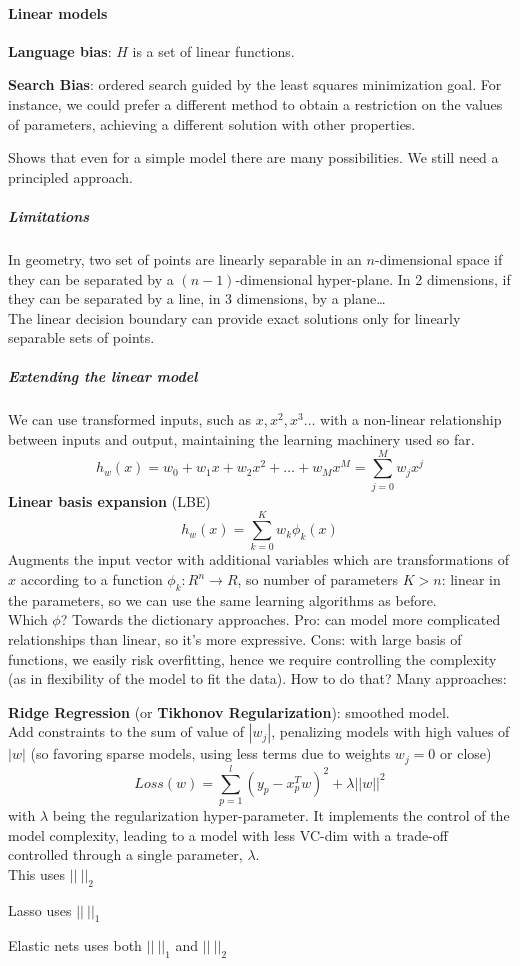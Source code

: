 \documentclass[10pt]{report}
\begin{document}
\paragraph{Linear models}\begin{list}{}{}
	\item \textbf{Language bias}: $H$ is a set of linear functions.
	\item \textbf{Search Bias}: ordered search guided by the least squares minimization goal. For instance, we could prefer a different method to obtain a restriction on the values of parameters, achieving a different solution with other properties.
\end{list}
Shows that even for a simple model there are many possibilities. We still need a principled approach.
\subparagraph{Limitations} In geometry, two set of points are linearly separable in an $n$-dimensional space if they can be separated by a $(n-1)$-dimensional hyper-plane. In 2 dimensions, if they can be separated by a line, in 3 dimensions, by a plane\ldots\\
The linear decision boundary can provide exact solutions only for linearly separable sets of points.
\subparagraph{Extending the linear model} We can use transformed inputs, such as $x, x^2, x^3\ldots$ with a non-linear relationship between inputs and output, maintaining the learning machinery used so far. $$h_w(x) = w_0 + w_1 x + w_2 x^2 + \ldots + w_M x^M = \sum_{j=0}^M w_j x^j$$ \textbf{Linear basis expansion} (LBE) $$h_w(x) = \sum_{k=0}^K w_k\phi_k(x)$$ Augments the input vector with additional variables which are transformations of $x$ according to a function $\phi_k : R^n \rightarrow R$, so number of parameters $K > n$: linear in the parameters, so we can use the same learning algorithms as before.\\
Which $\phi$? Towards the dictionary approaches. Pro: can model more complicated relationships than linear, so it's more expressive. Cons: with large basis of functions, we easily risk overfitting, hence we require controlling the complexity (as in flexibility of the model to fit the data). How to do that? Many approaches:
\begin{list}{}{}
	\item \textbf{Ridge Regression} (or \textbf{Tikhonov Regularization}): smoothed model.\\
	Add constraints to the sum of value of $|w_j|$, penalizing models with high values of $|w|$ (so favoring sparse models, using less terms due to weights $w_j = 0$ or close)
	$$Loss(w) = \sum_{p=1}^l (y_p - x_p^T w)^2 + \lambda||w||^2$$ with $\lambda$ being the regularization hyper-parameter. It implements the control of the model complexity, leading to a model with less VC-dim with a trade-off controlled through a single parameter, $\lambda$.\\
	This uses $||\:||_2$
	\item Lasso uses $||\:||_1$
	\item Elastic nets uses both $||\:||_1$ and $||\:||_2$
\end{list}
\end{document}
